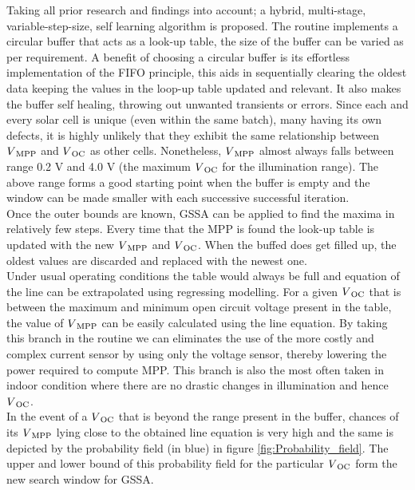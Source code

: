 Taking all prior research and findings into account; a hybrid, multi-stage, variable-step-size, self learning algorithm is proposed. The routine implements a circular buffer that acts as a look-up table, the size of the buffer can be varied as per requirement. A benefit of choosing a circular buffer is its effortless implementation of the \ac{FIFO} principle, this aids in sequentially clearing the oldest data keeping the values in the loop-up table updated and relevant. It also makes the buffer self healing, throwing out unwanted transients or errors. Since each and every solar cell is unique (even within the same batch), many having its own defects, it is highly unlikely that they exhibit the same relationship between $V\textsubscript{MPP}$ and $V\textsubscript{OC}$ as other cells. Nonetheless, $V\textsubscript{MPP}$ almost always falls between range 0.2 V and 4.0 V (the maximum $V\textsubscript{OC}$ for the illumination range). The above range forms a good starting point when the buffer is empty and the window can be made smaller with each successive successful iteration.\\

Once the outer bounds are known, \ac{GSSA} can be applied to find the maxima in relatively few steps. Every time that the \ac{MPP} is found the look-up table is updated with the new $V\textsubscript{MPP}$ and $V\textsubscript{OC}$. When the buffed does get filled up, the oldest values are discarded and replaced with the newest one.\\

Under usual operating conditions the table would always be full and equation of the line can be extrapolated using regressing modelling. For a given $V\textsubscript{OC}$ that is between the maximum and minimum open circuit voltage present in the table, the value of $V\textsubscript{MPP}$ can be easily calculated using the line equation. By taking this branch in the routine we can eliminates the use of the more costly and complex current sensor \cite{urayai2011single} by using only the voltage sensor, thereby lowering the power required to compute \ac{MPP}. This branch is also the most often taken in indoor condition where there are no drastic changes in illumination and hence $V\textsubscript{OC}$.\\  
         
In the event of a $V\textsubscript{OC}$ that is beyond the range present in the buffer, chances of its $V\textsubscript{MPP}$ lying close to the obtained line equation is very high and the same is depicted by the probability field (in blue) in figure \ref{fig:Probability_field}. The upper and lower bound of this probability field for the particular $V\textsubscript{OC}$ form the new search window for \ac{GSSA}.\\
 
